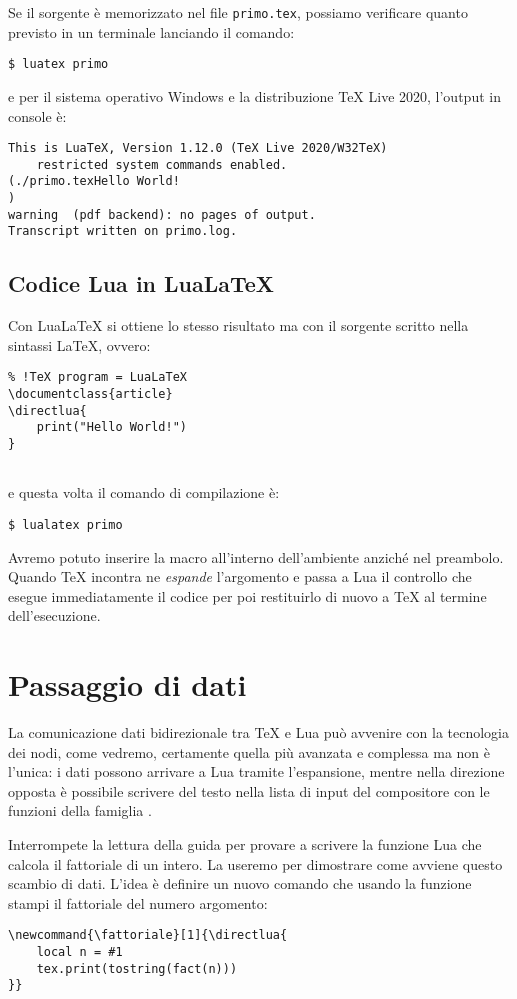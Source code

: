 Se il sorgente è memorizzato nel file \texttt{primo.tex}, possiamo verificare
quanto previsto in un terminale lanciando il comando:
\begin{Verbatim}[numbers=none]
$ luatex primo
\end{Verbatim}
e per il sistema operativo Windows e la distribuzione TeX Live 2020, l'output
in console è:
\begin{Verbatim}
This is LuaTeX, Version 1.12.0 (TeX Live 2020/W32TeX) 
    restricted system commands enabled.
(./primo.texHello World!
)
warning  (pdf backend): no pages of output.
Transcript written on primo.log.
\end{Verbatim}


\subsection{Codice Lua in Lua\LaTeX}
\label{secLuaInLuaLaTeX}

Con Lua\LaTeX{} si ottiene lo stesso risultato ma con il sorgente scritto nella
sintassi \LaTeX, ovvero:
\begin{Verbatim}
% !TeX program = LuaLaTeX
\documentclass{article}
\directlua{
    print("Hello World!")
}


\end{Verbatim}
e questa volta il comando di compilazione è:
\begin{Verbatim}[numbers=none]
$ lualatex primo
\end{Verbatim}

Avremo potuto inserire la macro all'interno dell'ambiente  anziché
nel preambolo. Quando \TeX{} incontra  ne \emph{espande}
l'argomento e passa a Lua il controllo che esegue immediatamente il codice per
poi restituirlo di nuovo a \TeX{} al termine dell'esecuzione.


\section{Passaggio di dati}
\label{secPassaggioDati}

La comunicazione dati bidirezionale tra \TeX{} e Lua può avvenire con la
tecnologia dei nodi, come vedremo, certamente quella più avanzata e complessa
ma non è l'unica: i dati possono arrivare a Lua tramite l'espansione, mentre
nella direzione opposta è possibile scrivere del testo nella lista di input
del compositore con le funzioni della famiglia .

Interrompete la lettura della guida per provare a scrivere la funzione Lua
 che calcola il fattoriale di un intero. La useremo per dimostrare come
avviene questo scambio di dati. L'idea è definire un nuovo comando che usando la funzione stampi il fattoriale del numero argomento:
\begin{Verbatim}
\newcommand{\fattoriale}[1]{\directlua{
    local n = #1
    tex.print(tostring(fact(n)))
}}
\end{Verbatim}

